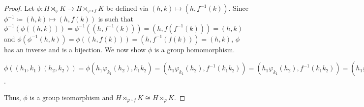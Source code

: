 \documentclass[addpoints,10pt]{exam}
\theoremstyle{plain}
\theoremstyle{definition}
\theoremstyle{plain}
\theoremstyle{plain}
\theoremstyle{definition}
\begin{document}
\begin{proof}
  Let $\phi:H\rtimes_{\varphi}K\to H\rtimes_{\varphi\circ f}K$ be defined via $(h,k)\mapsto (h,f^{-1}(k))$. Since $\phi^{-1}\coloneq (h,k)\mapsto (h,f(k))$ is such that $\phi^{-1}(\phi((h,k)))=\phi^{-1}((h,f^{-1}(k)))=(h,f(f^{-1}(k)))=(h,k)$ and $\phi(\phi^{-1}(h,k))=\phi((h,f(k)))=(h,f^{-1}(f(k)))=(h,k)$, $\phi$ has an inverse and is a bijection. We now show $\phi$ is a group homomorphism.
  \begin{center}
    $\phi((h_{1},k_{1})(h_{2},k_{2}))=\phi(h_{1}\varphi_{k_{1}}(h_{2}),k_{1}k_{2})=(h_{1}\varphi_{k_{1}}(h_{2}),f^{-1}(k_{1}k_{2}))=(h_{1}\varphi_{k_{1}}(h_{2}),f^{-1}(k_{1}k_{2}))=(h_{1}\varphi_{f(f^{-1}(k_{1}))}(h_{2}),f^{-1}(k_{1})f^{-1}(k_{2}))=(h_{1},f^{-1}(k_{1}))(h_{2},f^{-1}(k_{2}))=\phi((h_{1},k_{1}))\phi((h_{2},k_{2}))$.
  \end{center}
  Thus,  $\phi$ is a group isomorphism and $H\rtimes_{\varphi\circ f} K \cong H\rtimes_{\varphi} K$.

\end{proof}
\end{document}
